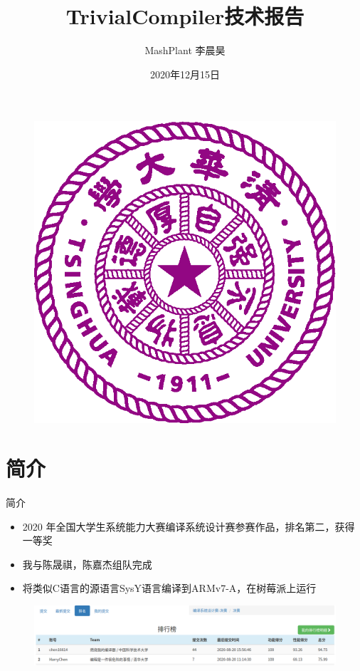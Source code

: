 \documentclass{beamer}
\author{MashPlant 李晨昊}
\title{TrivialCompiler技术报告}
\date{2020年12月15日}
\begin{document}
\kaishu
\begin{frame}
    \titlepage
    \begin{figure}[htpb]
        \begin{center}
            \includegraphics[width=0.2\linewidth]{pic/Tsinghua_University_Logo.eps}
        \end{center}
    \end{figure}
\end{frame}

\begin{frame}
    \tableofcontents[sectionstyle=show,subsectionstyle=show/shaded/hide,subsubsectionstyle=show/shaded/hide]
\end{frame}


\section{简介}

\begin{frame}{简介}
    \begin{itemize}
        \item 2020 年全国大学生系统能力大赛编译系统设计赛参赛作品，排名第二，获得一等奖
        \item 我与陈晟祺，陈嘉杰组队完成
        \item 将类似C语言的源语言SysY语言编译到ARMv7-A，在树莓派上运行
    \end{itemize}
  \begin{figure}[htpb]
    \centering
    \includegraphics[width=1.0\linewidth]{pic/rank.png}
  \end{figure}
\end{frame}
\end{document}
